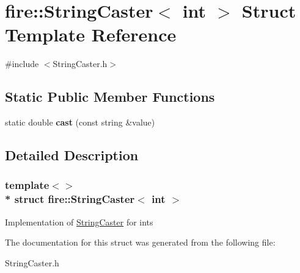 \hypertarget{a00033}{}\section{fire\+:\+:String\+Caster$<$ int $>$ Struct Template Reference}
\label{a00033}


{\ttfamily \#include $<$String\+Caster.\+h$>$}

\subsection*{Static Public Member Functions}
\begin{DoxyCompactItemize}
\item 
static double {\bfseries cast} (const string \&value)\hypertarget{a00033_a62373040bdd4acb9e2c890d83829e22f}{}\label{a00033_a62373040bdd4acb9e2c890d83829e22f}

\end{DoxyCompactItemize}


\subsection{Detailed Description}
\subsubsection*{template$<$$>$\\*
struct fire\+::\+String\+Caster$<$ int $>$}

Implementation of \hyperlink{a00029}{String\+Caster} for ints 

The documentation for this struct was generated from the following file\+:\begin{DoxyCompactItemize}
\item 
String\+Caster.\+h\end{DoxyCompactItemize}
